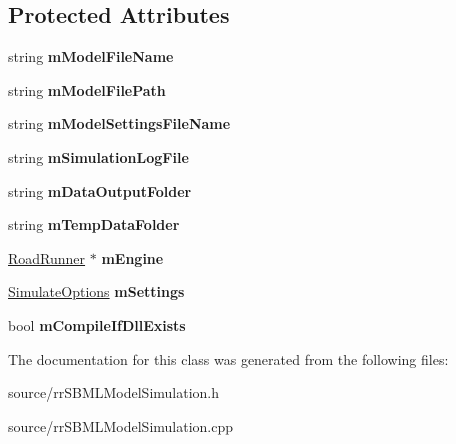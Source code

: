 \subsection*{Protected Attributes}
\begin{DoxyCompactItemize}
\item 
\hypertarget{classrr_1_1_s_b_m_l_model_simulation_a1b9524e46c6763794ea8cdfe6c57b172}{string {\bfseries m\-Model\-File\-Name}}\label{classrr_1_1_s_b_m_l_model_simulation_a1b9524e46c6763794ea8cdfe6c57b172}

\item 
\hypertarget{classrr_1_1_s_b_m_l_model_simulation_abe193c4217ff4fd5d97d037b688b8739}{string {\bfseries m\-Model\-File\-Path}}\label{classrr_1_1_s_b_m_l_model_simulation_abe193c4217ff4fd5d97d037b688b8739}

\item 
\hypertarget{classrr_1_1_s_b_m_l_model_simulation_ac1f08e8a2bd59043bd1ecf421d3ad2d6}{string {\bfseries m\-Model\-Settings\-File\-Name}}\label{classrr_1_1_s_b_m_l_model_simulation_ac1f08e8a2bd59043bd1ecf421d3ad2d6}

\item 
\hypertarget{classrr_1_1_s_b_m_l_model_simulation_a6a6c8fc3c3f4576420f036e01c76d1a1}{string {\bfseries m\-Simulation\-Log\-File}}\label{classrr_1_1_s_b_m_l_model_simulation_a6a6c8fc3c3f4576420f036e01c76d1a1}

\item 
\hypertarget{classrr_1_1_s_b_m_l_model_simulation_accdc5c822520b2b01f3313c3f512f585}{string {\bfseries m\-Data\-Output\-Folder}}\label{classrr_1_1_s_b_m_l_model_simulation_accdc5c822520b2b01f3313c3f512f585}

\item 
\hypertarget{classrr_1_1_s_b_m_l_model_simulation_a829d4b8bdf2ca2682d0cc2f131ba0fdf}{string {\bfseries m\-Temp\-Data\-Folder}}\label{classrr_1_1_s_b_m_l_model_simulation_a829d4b8bdf2ca2682d0cc2f131ba0fdf}

\item 
\hypertarget{classrr_1_1_s_b_m_l_model_simulation_a60f7673c75dc2d7ab3e907dc2ec53c39}{\hyperlink{classrr_1_1_road_runner}{Road\-Runner} $\ast$ {\bfseries m\-Engine}}\label{classrr_1_1_s_b_m_l_model_simulation_a60f7673c75dc2d7ab3e907dc2ec53c39}

\item 
\hypertarget{classrr_1_1_s_b_m_l_model_simulation_a82a1613c7dc11b95958aa3c98097a9e5}{\hyperlink{structrr_1_1_simulate_options}{Simulate\-Options} {\bfseries m\-Settings}}\label{classrr_1_1_s_b_m_l_model_simulation_a82a1613c7dc11b95958aa3c98097a9e5}

\item 
\hypertarget{classrr_1_1_s_b_m_l_model_simulation_a7824e8e1bad88a364acce34295fbb067}{bool {\bfseries m\-Compile\-If\-Dll\-Exists}}\label{classrr_1_1_s_b_m_l_model_simulation_a7824e8e1bad88a364acce34295fbb067}

\end{DoxyCompactItemize}


The documentation for this class was generated from the following files\-:\begin{DoxyCompactItemize}
\item 
source/rr\-S\-B\-M\-L\-Model\-Simulation.\-h\item 
source/rr\-S\-B\-M\-L\-Model\-Simulation.\-cpp\end{DoxyCompactItemize}
